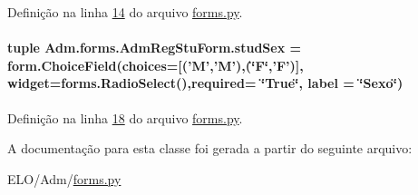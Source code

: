 Definição na linha \hyperlink{Adm_2forms_8py_source_l00014}{14} do arquivo \hyperlink{Adm_2forms_8py_source}{forms.\-py}.

\hypertarget{classAdm_1_1forms_1_1AdmRegStuForm_a3a4118b48fa8d77ceb006cd7da92cfd6}{
\paragraph[{stud\-Sex}]{\setlength{\rightskip}{0pt plus 5cm}tuple Adm.\-forms.\-Adm\-Reg\-Stu\-Form.\-stud\-Sex = form.\-Choice\-Field(choices=\mbox{[}('M','M'),(\char`\"{}F\char`\"{},'F')\mbox{]}, widget=forms.\-Radio\-Select(),required= \char`\"{}True\char`\"{}, label = \char`\"{}Sexo\char`\"{})\hspace{0.3cm}{\ttfamily [static]}}}\label{classAdm_1_1forms_1_1AdmRegStuForm_a3a4118b48fa8d77ceb006cd7da92cfd6}


Definição na linha \hyperlink{Adm_2forms_8py_source_l00018}{18} do arquivo \hyperlink{Adm_2forms_8py_source}{forms.\-py}.



A documentação para esta classe foi gerada a partir do seguinte arquivo\-:\begin{DoxyCompactItemize}
\item 
E\-L\-O/\-Adm/\hyperlink{Adm_2forms_8py}{forms.\-py}\end{DoxyCompactItemize}
